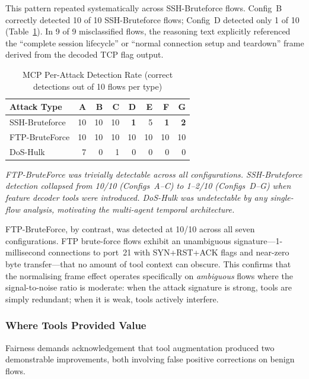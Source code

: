 \documentclass[../main.tex]{subfiles}
\begin{document}
This pattern repeated systematically across SSH-Bruteforce flows. Config~B correctly detected 10 of 10 SSH-Bruteforce flows; Config~D detected only 1 of 10 (Table~\ref{tab:mcp-per-attack}). In 9 of 9 misclassified flows, the reasoning text explicitly referenced the ``complete session lifecycle'' or ``normal connection setup and teardown'' frame derived from the decoded TCP flag output.

\begin{table}[H]
\centering
\caption{MCP Per-Attack Detection Rate (correct detections out of 10 flows per type)}
\label{tab:mcp-per-attack}
\small
\begin{tabular}{@{}l r r r r r r r@{}}
\toprule
Attack Type & A & B & C & D & E & F & G \\
\midrule
SSH-Bruteforce & 10 & 10 & 10 & \textbf{1} & 5 & \textbf{1} & \textbf{2} \\
FTP-BruteForce & 10 & 10 & 10 & 10 & 10 & 10 & 10 \\
DoS-Hulk       & 7  & 0  & 1  & 0  & 0  & 0  & 0 \\
\bottomrule
\end{tabular}

\vspace{0.5em}
\noindent\textit{FTP-BruteForce was trivially detectable across all configurations. SSH-Bruteforce detection collapsed from 10/10 (Configs~A--C) to 1--2/10 (Configs~D--G) when feature decoder tools were introduced. DoS-Hulk was undetectable by any single-flow analysis, motivating the multi-agent temporal architecture.}
\end{table}

FTP-BruteForce, by contrast, was detected at 10/10 across all seven configurations. FTP brute-force flows exhibit an unambiguous signature---1-millisecond connections to port~21 with SYN+RST+ACK flags and near-zero byte transfer---that no amount of tool context can obscure. This confirms that the normalising frame effect operates specifically on \textit{ambiguous} flows where the signal-to-noise ratio is moderate: when the attack signature is strong, tools are simply redundant; when it is weak, tools actively interfere.

\subsubsection{Where Tools Provided Value}

Fairness demands acknowledgement that tool augmentation produced two demonstrable improvements, both involving false positive corrections on benign flows.
\end{document}
